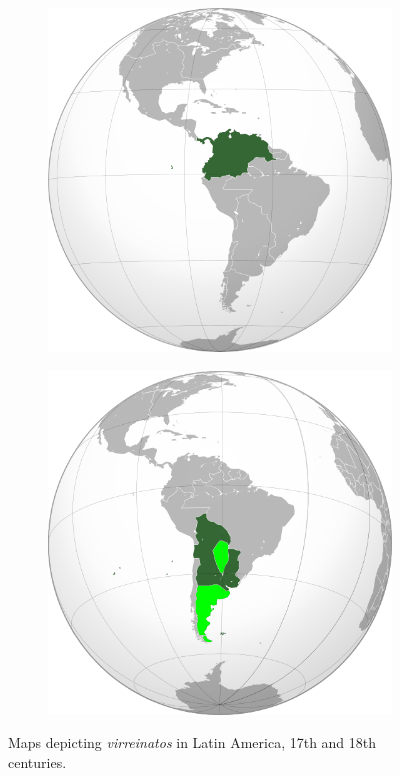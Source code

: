 \documentclass[12pt]{article}
\begin{document}
\begin{figure}[ht]
\begin{subfigure}{0.15\textwidth}
\caption{\label{fig:1b}}
\end{subfigure}
\begin{subfigure}{0.15\textwidth}
\includegraphics[width=\textwidth]{vice_nuevagranada.png}
\caption{\label{fig:1c}}
\end{subfigure}
\begin{subfigure}{0.15\textwidth}
\includegraphics[width=\textwidth]{vice_riodelaplata.png}
\caption{\label{fig:1d}}
\end{subfigure}
\caption{\label{fig:1} Maps depicting \textit{virreinatos} in Latin America, 17th and 18th centuries.}
\end{figure}
\end{document}
